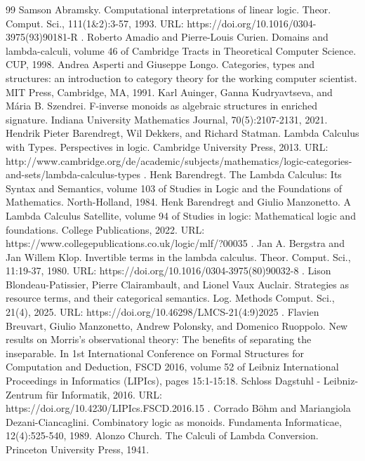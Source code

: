\begin{thebibliography}{99}
 Samson Abramsky. Computational interpretations of linear logic. Theor. Comput. Sci., 111(1\&2):3-57, 1993. URL: https://doi.org/10.1016/0304-3975(93)90181-R .
 Roberto Amadio and Pierre-Louis Curien. Domains and lambda-calculi, volume 46 of Cambridge Tracts in Theoretical Computer Science. CUP, 1998.
 Andrea Asperti and Giuseppe Longo. Categories, types and structures: an introduction to category theory for the working computer scientist. MIT Press, Cambridge, MA, 1991.
 Karl Auinger, Ganna Kudryavtseva, and Mária B. Szendrei. F-inverse monoids as algebraic structures in enriched signature. Indiana University Mathematics Journal, 70(5):2107-2131, 2021.
 Hendrik Pieter Barendregt, Wil Dekkers, and Richard Statman. Lambda Calculus with Types. Perspectives in logic. Cambridge University Press, 2013. URL: http://www.cambridge.org/de/academic/subjects/mathematics/logic-categories-and-sets/lambda-calculus-types .
 Henk Barendregt. The Lambda Calculus: Its Syntax and Semantics, volume 103 of Studies in Logic and the Foundations of Mathematics. North-Holland, 1984.
 Henk Barendregt and Giulio Manzonetto. A Lambda Calculus Satellite, volume 94 of Studies in logic: Mathematical logic and foundations. College Publications, 2022. URL: https://www.collegepublications.co.uk/logic/mlf/?00035 .
 Jan A. Bergstra and Jan Willem Klop. Invertible terms in the lambda calculus. Theor. Comput. Sci., 11:19-37, 1980. URL: https://doi.org/10.1016/0304-3975(80)90032-8 .
 Lison Blondeau-Patissier, Pierre Clairambault, and Lionel Vaux Auclair. Strategies as resource terms, and their categorical semantics. Log. Methods Comput. Sci., 21(4), 2025. URL: https://doi.org/10.46298/LMCS-21(4:9)2025 .
 Flavien Breuvart, Giulio Manzonetto, Andrew Polonsky, and Domenico Ruoppolo. New results on Morris’s observational theory: The benefits of separating the inseparable. In 1st International Conference on Formal Structures for Computation and Deduction, FSCD 2016, volume 52 of Leibniz International Proceedings in Informatics (LIPIcs), pages 15:1-15:18. Schloss Dagstuhl - Leibniz-Zentrum für Informatik, 2016. URL: https://doi.org/10.4230/LIPIcs.FSCD.2016.15 .
 Corrado Böhm and Mariangiola Dezani-Ciancaglini. Combinatory logic as monoids. Fundamenta Informaticae, 12(4):525-540, 1989.
 Alonzo Church. The Calculi of Lambda Conversion. Princeton University Press, 1941.

\end{thebibliography}
